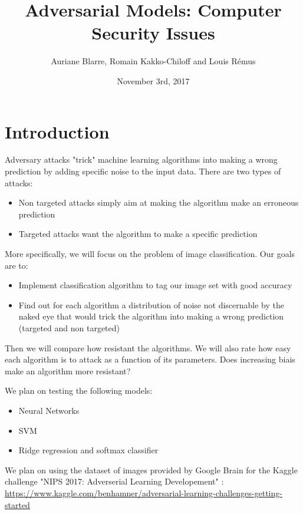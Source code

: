 \documentclass{article}
\title{Adversarial Models: Computer Security Issues}
\author{Auriane Blarre, Romain Kakko-Chiloff and Louis R\'emus}
\date{November 3rd,  2017}
\begin{document}
\maketitle

\section{Introduction}
Adversary attacks "trick" machine learning algorithms into making a wrong prediction by adding specific noise to the input data. There are two types of attacks:

\begin{itemize}
    \item Non targeted attacks simply aim at making the algorithm make an erroneous prediction
    \item Targeted attacks want the algorithm to make a specific prediction
\end{itemize}

More specifically, we will focus on the problem of image classification. Our goals are to:

\begin{itemize}
    \item Implement classification algorithm to tag our image set with good accuracy
    \item Find out for each algorithm a distribution of noise not discernable by the naked eye that would trick the algorithm into making a wrong prediction (targeted and non targeted)
\end{itemize}

Then we will compare how resistant the algorithms. We will also rate how easy each algorithm is to attack as a function of its parameters. Does increasing biais make an algorithm more resistant?


We plan on testing the following models:

\begin{itemize}
    \item Neural Networks
    \item SVM
    \item Ridge regression and softmax classifier
\end{itemize}

We plan on using the dataset of images provided by Google Brain for the Kaggle challenge "NIPS 2017: Adverserial Learning Developement" :
\newline
\url{https://www.kaggle.com/benhamner/adversarial-learning-challenges-getting-started}
\end{document}
